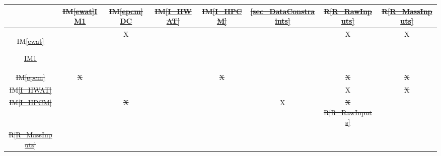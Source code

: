 \documentclass[12pt]{article}
\makeatletter
\newcommand{\iref}[1]{IM\ref{#1}}
\newcommand{\rref}[1]{R\ref{#1}}
\providecommand{\DIFaddtex}[1]{{\protect\color{blue}\uwave{#1}}} %
\providecommand{\DIFdeltex}[1]{{\protect\color{red}\sout{#1}}} %
\providecommand{\DIFaddFL}[1]{\DIFadd{#1}} %
\providecommand{\DIFdelFL}[1]{\DIFdel{#1}} %
\providecommand{\DIFaddbeginFL}{} %
\providecommand{\DIFaddendFL}{} %
\providecommand{\DIFdelbeginFL}{} %
\providecommand{\DIFdelendFL}{} %
\providecommand{\DIFadd}[1]{\texorpdfstring{\DIFaddtex{#1}}{#1}} %
\providecommand{\DIFdel}[1]{\texorpdfstring{\DIFdeltex{#1}}{}} %
\newcommand{\DIFscaledelfig}{0.5}
\newlength{\DIFdelgraphicswidth} %
\newlength{\DIFdelgraphicsheight} %
\newcommand{\DIFaddincludegraphics}[2][]{{\color{blue}\fbox{\DIFOincludegraphics[#1]{#2}}}} %
\newcommand{\DIFdelincludegraphics}[2][]{%
\sbox{\DIFdelgraphicsbox}{\DIFOincludegraphics[#1]{#2}}%
\settoboxwidth{\DIFdelgraphicswidth}{\DIFdelgraphicsbox} %
\settoboxtotalheight{\DIFdelgraphicsheight}{\DIFdelgraphicsbox} %
\scalebox{\DIFscaledelfig}{%
\parbox[b]{\DIFdelgraphicswidth}{\usebox{\DIFdelgraphicsbox}\\[-\baselineskip] \rule{\DIFdelgraphicswidth}{0em}}\llap{\resizebox{\DIFdelgraphicswidth}{\DIFdelgraphicsheight}{%
\setlength{\unitlength}{\DIFdelgraphicswidth}%
\begin{picture}(1,1)%
\thicklines\linethickness{2pt} %
{\color[rgb]{1,0,0}\put(0,0){\framebox(1,1){}}}%
{\color[rgb]{1,0,0}\put(0,0){\line( 1,1){1}}}%
{\color[rgb]{1,0,0}\put(0,1){\line(1,-1){1}}}%
\end{picture}%
}\hspace*{3pt}}} %
} %
\DeclareRobustCommand{\DIFaddbeginFL}{\DIFOaddbeginFL \let\includegraphics\DIFaddincludegraphics} %
\DeclareRobustCommand{\DIFaddendFL}{\DIFOaddendFL \let\includegraphics\DIFOincludegraphics} %
\DeclareRobustCommand{\DIFdelbeginFL}{\DIFOdelbeginFL \let\includegraphics\DIFdelincludegraphics} %
\DeclareRobustCommand{\DIFdelendFL}{\DIFOaddendFL \let\includegraphics\DIFOincludegraphics} %
\let\sout@orig\sout %
\renewcommand{\sout}[1]{\ifmmode\text{\sout@orig{\ensuremath{#1}}}\else\sout@orig{#1}\fi} %
\makeatother
\begin{document}
\begin{table}[h!]
  \centering
  \begin{tabular}{|c|c|c|c|c|c|c|c|}
  \hline
  & \DIFdelbeginFL \DIFdelFL{\iref{ewat}}\DIFdelendFL \DIFaddbeginFL \hyperref[IM:ArmPathPlanning]{IM1} 
  \DIFaddendFL & \DIFdelbeginFL \DIFdelFL{\iref{epcm}}\DIFdelendFL \DIFaddbeginFL \hyperref[sec_DataConstraints]{DC} 
  \DIFaddendFL & \DIFdelbeginFL \DIFdelFL{\iref{I_HWAT}}\DIFdelendFL \DIFaddbeginFL \DIFaddFL{\rref{R_Inputs} 
  }\DIFaddendFL & \DIFdelbeginFL \DIFdelFL{\iref{I_HPCM}}\DIFdelendFL \DIFaddbeginFL \DIFaddFL{\rref{R_OutputInputs} 
  }\DIFaddendFL & \DIFdelbeginFL \DIFdelFL{\ref{sec_DataConstraints}}\DIFdelendFL \DIFaddbeginFL \DIFaddFL{\rref{R_Calculate} 
  }\DIFaddendFL & \DIFdelbeginFL \DIFdelFL{\rref{R_RawInputs}}\DIFdelendFL \DIFaddbeginFL \DIFaddFL{\rref{R_VerifyOutput} 
  }\DIFaddendFL & \DIFdelbeginFL \DIFdelFL{\rref{R_MassInputs} }\DIFdelendFL \DIFaddbeginFL \DIFaddFL{\rref{R_Output} }\DIFaddendFL \\
  \hline
  \DIFdelbeginFL \DIFdelFL{\iref{ewat}            }\DIFdelendFL \DIFaddbeginFL 

  \hyperref[IM:ArmPathPlanning]{IM1} \DIFaddendFL & 
       & X &   &   &   & X & X \\ 
  \hline
\DIFdelbeginFL \DIFdelFL{\iref{epcm}            }\DIFdelendFL \DIFaddbeginFL 

  \DIFaddFL{\rref{R_Inputs} }\DIFaddendFL & 
       \DIFdelbeginFL \DIFdelFL{X}\DIFdelendFL &   &   &   \DIFdelbeginFL \DIFdelFL{X}\DIFdelendFL &   &   \DIFdelbeginFL \DIFdelFL{X}\DIFdelendFL &   \DIFdelbeginFL \DIFdelFL{X }\DIFdelendFL \\ 
  \hline
\DIFdelbeginFL \DIFdelFL{\iref{I_HWAT}          }\DIFdelendFL \DIFaddbeginFL 

  \DIFaddFL{\rref{R_OutputInputs} }\DIFaddendFL & 
       &   &   &   &   & X &   \DIFdelbeginFL \DIFdelFL{X }\DIFdelendFL \\ 
  \hline
\DIFdelbeginFL \DIFdelFL{\iref{I_HPCM}          }\DIFdelendFL \DIFaddbeginFL 

  \DIFaddFL{\rref{R_Calculate} }\DIFaddendFL & 
       &   \DIFdelbeginFL \DIFdelFL{X}\DIFdelendFL &   &   & \DIFdelbeginFL %
\DIFdelendFL X &   \DIFdelbeginFL \DIFdelFL{X }%
\DIFdelFL{\rref{R_RawInputs}     }\DIFdelendFL &   \DIFdelbeginFL %
\DIFdelendFL \\ 
  \hline
\DIFdelbeginFL \DIFdelFL{\rref{R_MassInputs}    }\DIFdelendFL \DIFaddbeginFL 


\end{tabular}
\end{table}
\end{document}
